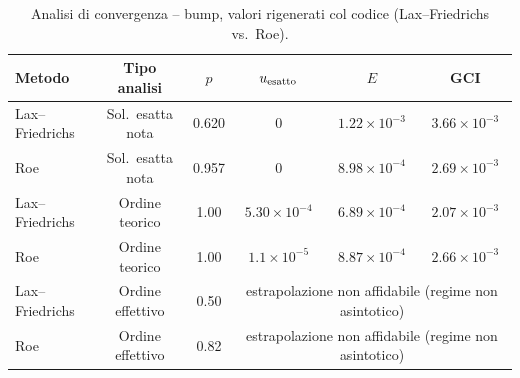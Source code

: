 \begin{table}[H]
  \centering
  \caption{Analisi di convergenza -- bump, valori rigenerati col codice (Lax--Friedrichs vs.\ Roe).}
  \label{tab:bump_convergenza}
  \renewcommand{\arraystretch}{1.25}
  \begin{tabular}{lccccc}
    \toprule
    Metodo & Tipo analisi & $p$ & $u_{\rm esatto}$ & $E$ & GCI \\
    \midrule
    Lax--Friedrichs & Sol.\ esatta nota  & 0.620 & 0 & $1.22\times10^{-3}$ & $3.66\times10^{-3}$ \\
    Roe             & Sol.\ esatta nota  & 0.957 & 0 & $8.98\times10^{-4}$ & $2.69\times10^{-3}$ \\
    \midrule
    Lax--Friedrichs & Ordine teorico     & 1.00  & $5.30\times10^{-4}$ & $6.89\times10^{-4}$ & $2.07\times10^{-3}$ \\
    Roe             & Ordine teorico     & 1.00  & $1.1\times10^{-5}$  & $8.87\times10^{-4}$ & $2.66\times10^{-3}$ \\
    \midrule
    Lax--Friedrichs & Ordine effettivo   & 0.50  & \multicolumn{3}{c}{estrapolazione non affidabile (regime non asintotico)} \\
    Roe             & Ordine effettivo   & 0.82  & \multicolumn{3}{c}{estrapolazione non affidabile (regime non asintotico)} \\
    \bottomrule
  \end{tabular}
\end{table}

